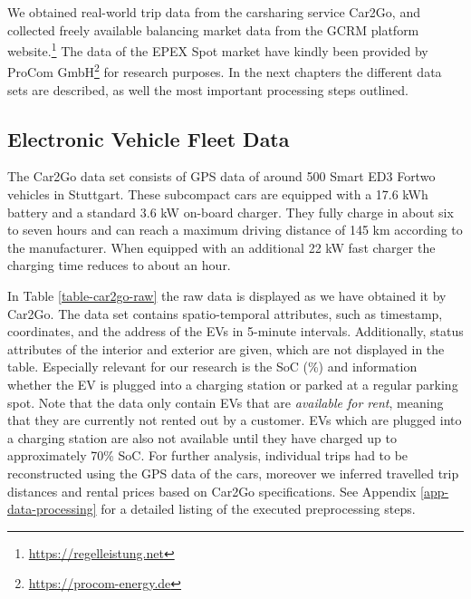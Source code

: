 \documentclass[a4paper, 12pt]{article}
\begin{document}
We obtained real-world trip data from the carsharing service Car2Go, and
collected freely available balancing market data from the GCRM platform
website.\footnote{\url{https://regelleistung.net}} The data of the EPEX Spot market have kindly been provided by
ProCom GmbH\footnote{\url{https://procom-energy.de}} for research purposes. In the next chapters the different
data sets are described, as well the most important processing steps outlined.

\subsection{Electronic Vehicle Fleet Data \label{sec-data-car2go}}
\label{sec:org7ab79e3}
The Car2Go data set consists of GPS data of around 500 Smart ED3 Fortwo vehicles
in Stuttgart. These subcompact cars are equipped with a 17.6 kWh battery and a
standard 3.6 kW on-board charger. They fully charge in about six to seven hours
and can reach a maximum driving distance of 145 km according to the manufacturer.
When equipped with an additional 22 kW fast charger the charging time reduces to
about an hour.

In Table \ref{table-car2go-raw} the raw data is displayed as we have obtained it
by Car2Go. The data set contains spatio-temporal attributes, such as timestamp,
coordinates, and the address of the EVs in 5-minute intervals. Additionally,
status attributes of the interior and exterior are given, which are not
displayed in the table. Especially relevant for our research is the SoC (\%)
and information whether the EV is plugged into a charging station or parked at a
regular parking spot. Note that the data only contain EVs that are \emph{available
for rent}, meaning that they are currently not rented out by a customer. EVs
which are plugged into a charging station are also not available until they have
charged up to approximately 70\% SoC. For further analysis, individual trips had
to be reconstructed using the GPS data of the cars, moreover we inferred
travelled trip distances and rental prices based on Car2Go specifications. See
Appendix \ref{app-data-processing} for a detailed listing of the executed
preprocessing steps.
\end{document}
